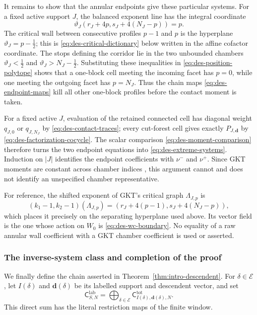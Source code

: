 It remains to show that the annular endpoints give these particular systems.
For a fixed active support $J$, the balanced exponent line has the integral
coordinate
\begin{equation}
 \vartheta_J(r_J+4p,s_J+4(N_J-p))=p.
 \label{eq:des-slope-coordinate}
\end{equation}
The critical wall between consecutive profiles $p-1$ and $p$ is the
hyperplane $\vartheta_J=p-\tfrac12$; this is
\eqref{eq:des-critical-dictionary} below written in the affine cofactor
coordinate.  The stops defining the corridor lie in the two unbounded
chambers $\vartheta_J<\tfrac12$ and
$\vartheta_J>N_J-\tfrac12$.  Substituting these inequalities in
\eqref{eq:des-position-polytope} shows that a one-block cell meeting the
incoming facet has $p=0$, while one meeting the outgoing facet has
$p=N_J$.  Thus the chain maps \eqref{eq:des-endpoint-maps} kill all other
one-block profiles before the contact moment is taken.

For a fixed active $J$, evaluation of the retained connected cell has
diagonal weight $q_{J,0}$ or $q_{J,N_J}$ by
\eqref{eq:des-contact-traces}; every cut-forest cell gives exactly
$P_{J,\mathbf d}$ by \eqref{eq:des-factorization-cocycle}.  The scalar
comparison \eqref{eq:des-moment-comparison} therefore turns the two endpoint
equations into \eqref{eq:des-extreme-systems}.  Induction on $|J|$ identifies
the endpoint coefficients with $\nu^-$ and $\nu^+$.  Since GKT moments are
constant across chamber indices
\cite[Cor.~4.28]{grossetal2022open}, this argument cannot and does not
identify an unspecified chamber representative.

For reference, the shifted exponent of GKT's critical graph
$\Lambda_{J,p}$ is
\begin{equation}
 (k_1-1,k_2-1)(\Lambda_{J,p})
 =(r_J+4(p-1),s_J+4(N_J-p)),
 \label{eq:des-critical-dictionary}
\end{equation}
which places it precisely on the separating hyperplane used above.  Its
vector field is the one whose action on $W_0$ is
\eqref{eq:des-wc-boundary}.  No equality of a raw annular wall coefficient
with a GKT chamber coefficient is used or asserted.

\subsubsection{The inverse-system class and completion of the proof}

We finally define the chain asserted in
Theorem~\ref{thm:intro-descendent}.  For $\delta\in\mathcal E$, let
$I(\delta)$ and $\mathbf d(\delta)$ be its labelled support and descendent
vector, and set
\begin{equation}
 \mathsf C^{\mathrm{lab}}_{S,N}
 =\bigoplus_{\delta\in\mathcal E}
   \mathsf C^{\mathrm{tot}}_{I(\delta),\mathbf d(\delta),N}.
 \label{eq:des-window-total-complex}
\end{equation}
This direct sum has the literal restriction maps of the finite window.

